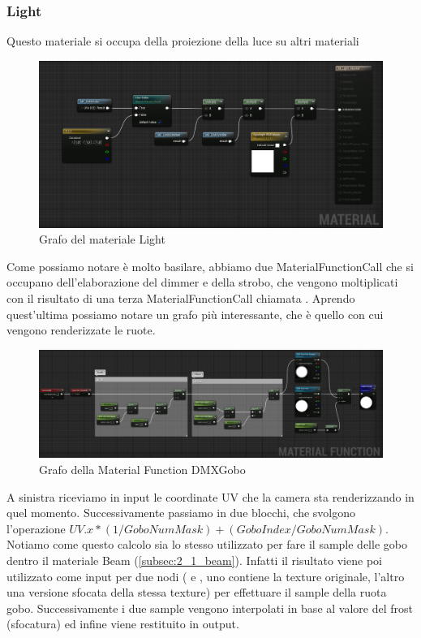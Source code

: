 \documentclass[main.tex]{subfiles}
\begin{document}
\subsubsection{Light}\label{subsec:2_1_light}
Questo materiale si occupa della proiezione della luce su altri materiali
\begin{figure}[H]
    \centering
    \includegraphics[width=1\linewidth]{img/renderingPipeline/LightMaterialFull.jpg}
    \caption{Grafo del materiale Light}
    \label{fig:2_lightGraphFull}
\end{figure}
Come possiamo notare è molto basilare, abbiamo due MaterialFunctionCall che si occupano dell'elaborazione del dimmer e della strobo, che vengono moltiplicati con il risultato di una terza MaterialFunctionCall chiamata . Aprendo quest'ultima possiamo notare un grafo più interessante, che è quello con cui vengono renderizzate le ruote.
\begin{figure}[H]
    \centering
    \includegraphics[width=1\linewidth]{img/renderingPipeline/DMXGoboMFFull.jpg}
    \caption{Grafo della Material Function DMXGobo}
    \label{fig:2_dmxGoboGraphFull}
\end{figure}
A sinistra riceviamo in input le coordinate UV che la camera sta renderizzando in quel momento. Successivamente passiamo in due blocchi, che svolgono l'operazione $UV.x * (1 / GoboNumMask) + (GoboIndex / GoboNumMask)$. Notiamo come questo calcolo sia lo stesso utilizzato per fare il sample delle gobo dentro il materiale Beam (\ref{subsec:2_1_beam}). Infatti il risultato viene poi utilizzato come input per due nodi ( e , uno contiene la texture originale, l'altro una versione sfocata della stessa texture) per effettuare il sample della ruota gobo. Successivamente i due sample vengono interpolati in base al valore del frost (sfocatura) ed infine viene restituito in output.
\end{document}

